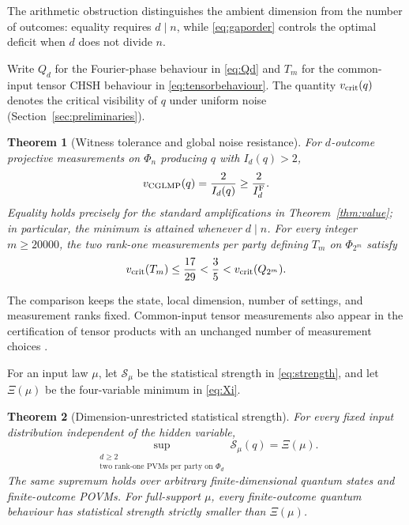 \documentclass[11pt]{amsart}
\newtheorem{theorem}{Theorem}[section]
\theoremstyle{remark}
\theoremstyle{plain}
\numberwithin{equation}{section}
\newcommand{\IF}{I_d^{\rm F}}
\begin{document}
The arithmetic obstruction distinguishes the ambient dimension from
the number of outcomes: equality requires \(d\mid n\), while
\eqref{eq:gaporder} controls the optimal deficit when \(d\) does not
divide \(n\).

Write \(Q_d\) for the Fourier-phase behaviour in \eqref{eq:Qd} and
\(T_m\) for the common-input tensor CHSH behaviour in
\eqref{eq:tensorbehaviour}. The quantity \(v_{\rm crit}(q)\) denotes
the critical visibility of \(q\) under uniform noise
(Section~\ref{sec:preliminaries}).

\begin{theorem}[Witness tolerance and global noise resistance]
\label{thm:noise}
For \(d\)-outcome projective measurements on \(\Phi_n\) producing
\(q\) with \(I_d(q)>2\),
\begin{equation}\label{eq:witnessnoise}
 v_{\rm CGLMP}(q)=\frac2{I_d(q)}\ge\frac2{\IF}.
\end{equation}
Equality holds precisely for the standard amplifications in
Theorem~\ref{thm:value}; in particular, the minimum is attained
whenever \(d\mid n\).
For every integer \(m\ge20000\), the two rank-one measurements per
party defining \(T_m\) on \(\Phi_{2^m}\) satisfy
\begin{equation}\label{eq:noiseseparation}
 v_{\rm crit}(T_m)\le\frac{17}{29}
       <\frac35<v_{\rm crit}(Q_{2^m}).
\end{equation}
\end{theorem}

The comparison keeps the state, local dimension, number of settings,
and measurement ranks fixed. Common-input tensor measurements also
appear in the certification of tensor products with an unchanged
number of measurement choices \cite{SCB}.

For an input law \(\mu\), let \(\mathcal S_\mu\) be the statistical
strength in \eqref{eq:strength}, and let \(\Xi(\mu)\) be the
four-variable minimum in \eqref{eq:Xi}.

\begin{theorem}[Dimension-unrestricted statistical strength]
\label{thm:supremum}
For every fixed input distribution independent of the hidden variable,
\begin{equation}\label{eq:supremum}
 \sup_{\substack{d\ge2\\
     \text{two rank-one PVMs per party on }\Phi_d}}
       \mathcal S_\mu(q)=\Xi(\mu).
\end{equation}
The same supremum holds over arbitrary finite-dimensional quantum
states and finite-outcome POVMs. For full-support \(\mu\), every
finite-outcome quantum behaviour has statistical strength strictly
smaller than \(\Xi(\mu)\).
\end{theorem}
\end{document}

